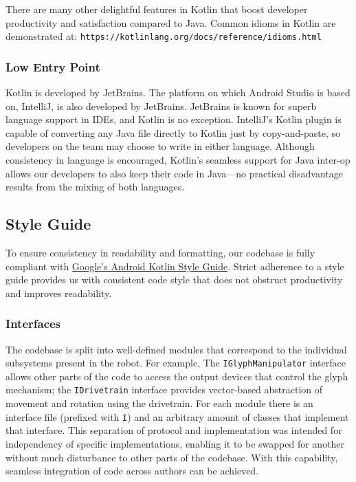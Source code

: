 \documentclass[letterpaper]{article}
\begin{document}
There are many other delightful features in Kotlin that boost developer productivity and satisfaction compared to Java. Common idioms in Kotlin are demonstrated at: \texttt{https://kotlinlang.org/docs/reference/idioms.html}

\subsubsection{Low Entry Point}

Kotlin is developed by JetBrains. The platform on which Android Studio is based on, IntelliJ, is also developed by JetBrains. JetBrains is known for superb language support in IDEs, and Kotlin is no exception. IntelliJ's Kotlin plugin is capable of converting any Java file directly to Kotlin just by copy-and-paste, so developers on the team may choose to write in either language. Although consistency in language is encouraged, Kotlin's seamless support for Java inter-op allows our developers to also keep their code in Java---no practical disadvantage results from the mixing of both languages.

\subsection{Style Guide}

To ensure consistency in readability and formatting, our codebase is fully compliant with \href{https://android.github.io/kotlin-guides/style.html}{Google's Android Kotlin Style Guide}. Strict adherence to a style guide provides us with consistent code style that does not obstruct productivity and improves readability.

\subsubsection{Interfaces}

The codebase is split into well-defined modules that correspond to the individual subsystems present in the robot. For example, The \texttt{IGlyphManipulator} interface allows other parts of the code to access the output devices that control the glyph mechanism; the \texttt{IDrivetrain} interface provides vector-based abstraction of movement and rotation using the drivetrain. For each module there is an interface file (prefixed with \texttt{I}) and an arbitrary amount of classes that implement that interface. This separation of protocol and implementation was intended for independency of specific implementations, enabling it to be swapped for another without much disturbance to other parts of the codebase. With this capability, seamless integration of code across authors can be achieved.
\end{document}
